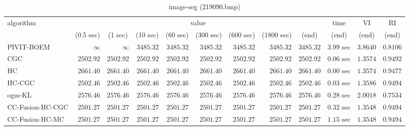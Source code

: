 \begin{table}[H]
\scriptsize
\centering
\caption{image-seg (219090.bmp)}
\label{tab:anytimetable-image-seg-219090.bmp}
\begin{tabular}{lrrrrrrrrrrr}
\toprule
           algorithm &                                   \multicolumn{8}{c}{value} & \multicolumn{1}{c}{time}    & \multicolumn{1}{c}{VI}  & \multicolumn{1}{c}{RI} \\  
\cmidrule(lr){2-9}\cmidrule(lr){10-10} \cmidrule(lr){11-11} \cmidrule(lr){12-12}   
                     & \multicolumn{1}{c}{(0.5 sec)} & \multicolumn{1}{c}{(1 sec)} & \multicolumn{1}{c}{(10 sec)} & \multicolumn{1}{c}{(60 sec)} & \multicolumn{1}{c}{(300 sec)} & \multicolumn{1}{c}{(600 sec)} & \multicolumn{1}{c}{(1800 sec)} & \multicolumn{1}{c}{(end)} & \multicolumn{1}{c}{(end)}    & \multicolumn{1}{c}{(end)}   & \multicolumn{1}{c}{(end)}  \\ \midrule 
          PIVIT-BOEM & $\infty$ & $\infty$ & $      3485.32$ & $      3485.32$ & $      3485.32$ & $      3485.32$ & $      3485.32$ & $      3485.32$ & $         3.99$ sec    & $       3.8640$  & $       0.8106$ \\ 
                 CGC & $      2502.92$ & $      2502.92$ & $      2502.92$ & $      2502.92$ & $      2502.92$ & $      2502.92$ & $      2502.92$ & $      2502.92$ & $         0.06$ sec    & $       1.3574$  & $       0.9492$ \\ 
                  HC & $      2661.40$ & $      2661.40$ & $      2661.40$ & $      2661.40$ & $      2661.40$ & $      2661.40$ & $      2661.40$ & $      2661.40$ & $         0.00$ sec    & $       1.3574$  & $       0.9477$ \\ 
              HC-CGC & $      2502.46$ & $      2502.46$ & $      2502.46$ & $      2502.46$ & $      2502.46$ & $      2502.46$ & $      2502.46$ & $      2502.46$ & $         0.03$ sec    & $       1.3586$  & $       0.9494$ \\ 
              ogm-KL & $      2576.46$ & $      2576.46$ & $      2576.46$ & $      2576.46$ & $      2576.46$ & $      2576.46$ & $      2576.46$ & $      2576.46$ & $         0.28$ sec    & $       2.0018$  & $       0.7534$ \\ 
    CC-Fusion-HC-CGC & $      2501.27$ & $      2501.27$ & $      2501.27$ & $      2501.27$ & $      2501.27$ & $      2501.27$ & $      2501.27$ & $      2501.27$ & $         0.32$ sec    & $       1.3548$  & $       0.9494$ \\ 
     CC-Fusion-HC-MC & $      2501.27$ & $      2501.27$ & $      2501.27$ & $      2501.27$ & $      2501.27$ & $      2501.27$ & $      2501.27$ & $      2501.27$ & $         1.15$ sec    & $       1.3548$  & $       0.9494$ \\ 

\end{tabular}
\end{table}
